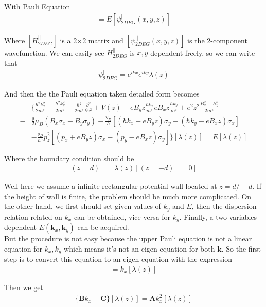 With Pauli Equation
\begin{align*}
	[H^{||}_{2DEG}][\psi^{||}_{2DEG}(x,y,z)]=E[\psi^{||}_{2DEG}(x,y,z)]
\end{align*}

Where $[H^{||}_{2DEG}]$ is a 2$\times$2 matrix and $[\psi^{||}_{2DEG}(x,y,z)]$ is the 2-component wavefunction. We can easily see $H_{2DEG}^{||}$ is $x,y$ dependent freely, so we can write that
\begin{align*}
	\psi^{||}_{2DEG}=e^{ikx}e^{iky}\lambda(z)
\end{align*}


And then the the Pauli equation taken detailed form becomes
\begin{align*}
	&\Big\{\frac{\hbar^2k_x^2}{2m^\star}+\frac{\hbar^2k_y^2}{2m^\star}-\frac{\hbar^2}{2m^\star}\frac{\partial^2}{\partial z^2}+V(z)+eB_yz\frac{\hbar k_x}{m^\star}eB_xz\frac{\hbar k_y}{m^\star}+e^2z^2\frac{B_x^2+B_y^2}{2m^\star}\\-
	&\frac{g}{2}\mu_B(B_x\sigma_x+B_y\sigma_y)-\frac{\eta_R}{\hbar}[(\hbar k_x+eB_yz)\sigma_y-(\hbar k_y-eB_xz)\sigma_x]\\
	&-\frac{\nu_D}{\hbar^3}p_z^2[(p_x+eB_yz)\sigma_x-(p_y-eB_xz)\sigma_y]\Big\}[\lambda(z)]=E[\lambda(z)]
\end{align*}

Where the boundary condition should be 
\begin{align}
  [\lambda(z)](z=d)=[\lambda(z)](z=-d)=[0]
\end{align}

Well here we assume a infinite rectangular potential wall located at $z=d/-d$. If the height of wall is finite, the problem should be much more complicated. On the other hand, we first should set given values of $k_y$ and $E$, then the dispersion relation related on $k_x$ can be obtained, vice versa for $k_y$. Finally, a two variables dependent $E(\pmb{k}_x,\pmb{k}_y)$ can be acquired. \\

But the procedure is not easy because the upper Pauli equation is not a linear equation for $k_x, k_y$ which means it's not an eigen-equation for both $\pmb{k}$. So the first step is to convert this equation to an eigen-equation with the expression
\begin{align}
  [\varsigma(z)]=k_x[\lambda(z)]
\end{align}

Then we get 
\begin{align}
  \{\pmb{B}k_x+\pmb{C}\}[\lambda(z)]=\pmb{A}k_x^2[\lambda(z)]
\end{align}

